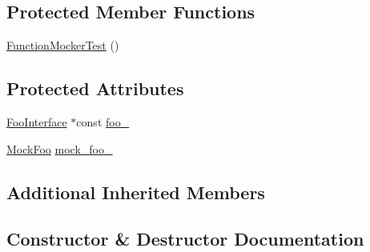\subsection*{Protected Member Functions}
\begin{DoxyCompactItemize}
\item 
\hyperlink{classtesting_1_1gmock__generated__function__mockers__test_1_1_function_mocker_test_a22216ac0755e96e21c0f76068ff64f03}{Function\+Mocker\+Test} ()
\end{DoxyCompactItemize}
\subsection*{Protected Attributes}
\begin{DoxyCompactItemize}
\item 
\hyperlink{classtesting_1_1gmock__generated__function__mockers__test_1_1_foo_interface}{Foo\+Interface} $\ast$const \hyperlink{classtesting_1_1gmock__generated__function__mockers__test_1_1_function_mocker_test_ae2b8b577c4808f2dff9797168468f65f}{foo\+\_\+}
\item 
\hyperlink{classtesting_1_1gmock__generated__function__mockers__test_1_1_mock_foo}{Mock\+Foo} \hyperlink{classtesting_1_1gmock__generated__function__mockers__test_1_1_function_mocker_test_a265659f07a0e75152ab295add4769585}{mock\+\_\+foo\+\_\+}
\end{DoxyCompactItemize}
\subsection*{Additional Inherited Members}


\subsection{Constructor \& Destructor Documentation}
\mbox{\label{classtesting_1_1gmock__generated__function__mockers__test_1_1_function_mocker_test_a22216ac0755e96e21c0f76068ff64f03}} 
